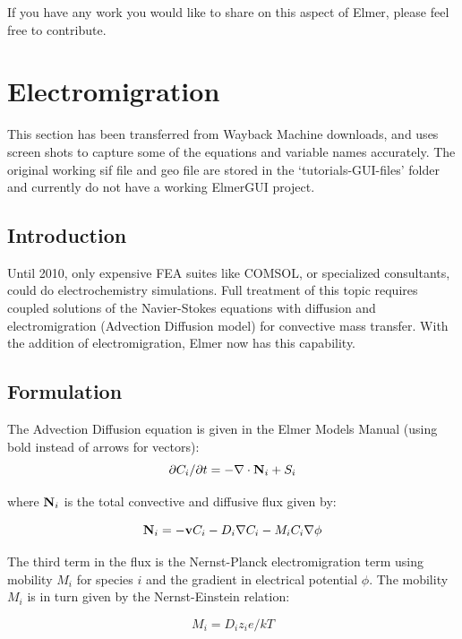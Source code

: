 \noindent If you have any work you would like to share on this aspect of Elmer, please feel free to contribute. 

\section{Electromigration}

This section has been transferred from Wayback Machine downloads, and uses screen shots to capture some of the equations and variable names accurately.  The original working sif file and geo file are stored in the `tutorials-GUI-files' folder and currently do not have a working ElmerGUI project.

\subsection{Introduction}

Until 2010, only expensive FEA suites like COMSOL, or specialized consultants, could do electrochemistry simulations. Full treatment of this topic requires coupled solutions of the Navier-Stokes equations with diffusion and electromigration (Advection Diffusion model) for convective mass transfer. With the addition of electromigration, Elmer now has this capability. 

\subsection{Formulation}

The Advection Diffusion equation is given in the Elmer Models Manual (using bold instead of arrows for vectors):\\

\begin{equation}
\partial C_i/ \partial t =  - \nabla \cdot \bold N_i + S_i
\end{equation}

where $\bold N_i$ is the total convective and diffusive flux given by:

\begin{equation}
\bold N_i = -\bold v C_i - D_i \nabla C_i - M_i C_i \nabla \phi
\end{equation}

The third term in the flux is the Nernst-Planck electromigration term using mobility $M_i$ for species $i$ and the gradient in electrical potential $\phi $. The mobility $M_i$ is in turn given by the Nernst-Einstein relation:

\begin{equation}
M_i = D_i z_i e/kT
\end{equation}

